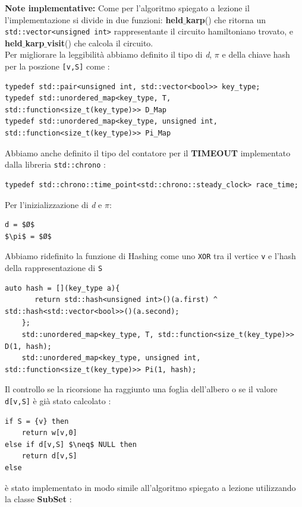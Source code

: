 \documentclass[]{article}
\begin{document}
\begin{flushleft}
\textbf{Note implementative:}
Come per l'algoritmo spiegato a lezione il l'implementazione si divide in due funzioni: \textbf{held$\_$karp}() che ritorna un \verb|std::vector<unsigned int>| rappresentante il circuito hamiltoniano trovato, e \textbf{held$\_$karp$\_$visit}() che calcola il circuito.\\
Per migliorare la leggibilità abbiamo definito il tipo di \textit{d}, $\pi$ e della chiave hash per la poszione \verb|[v,S]| come :
\lstset{language=c++, style=mystyle, firstnumber=1}
\begin{lstlisting}
typedef std::pair<unsigned int, std::vector<bool>> key_type;
typedef std::unordered_map<key_type, T, std::function<size_t(key_type)>> D_Map
typedef std::unordered_map<key_type, unsigned int, std::function<size_t(key_type)>> Pi_Map
\end{lstlisting}
Abbiamo anche definito il tipo del contatore per il \textbf{TIMEOUT} implementato dalla libreria \verb|std::chrono| :
\lstset{language=c++, style=mystyle, firstnumber=4}
\begin{lstlisting}
typedef std::chrono::time_point<std::chrono::steady_clock> race_time;
\end{lstlisting}
\medskip
Per l'inizializzazione di \textit{d} e $\pi$: 
\begin{lstlisting}[mathescape=true]
d = $Ø$
$\pi$ = $Ø$
\end{lstlisting}
Abbiamo ridefinito la funzione di Hashing come uno \verb|XOR| tra il vertice \verb|v| e l'hash della rappresentazione di \verb|S|
\lstset{language=c++, style=mystyle, firstnumber=35}
\begin{lstlisting}
auto hash = [](key_type a){
       return std::hash<unsigned int>()(a.first) ^ std::hash<std::vector<bool>>()(a.second);
    };
    std::unordered_map<key_type, T, std::function<size_t(key_type)>> D(1, hash);
    std::unordered_map<key_type, unsigned int, std::function<size_t(key_type)>> Pi(1, hash);
\end{lstlisting}
\medskip
Il controllo se la ricorsione ha raggiunto una foglia dell'albero o se il valore \verb|d[v,S]| è già stato calcolato :
\begin{lstlisting}[mathescape=true]
if S = {v} then
	return w[v,0]
else if d[v,S] $\neq$ NULL then
	return d[v,S]
else
\end{lstlisting}
è stato implementato in modo simile all'algoritmo spiegato a lezione utilizzando la classe \textbf{SubSet} :

\end{flushleft}
\end{document}

